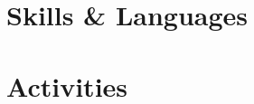 \documentclass[10pt]{article}
\begin{document}
\cockpit
\befungepy
\termdo
\matsciseg
\ratiocontour
\digitalcollation

\begin{minipage}{\linewidth}
  \section{Skills \& Languages}
  \begin{multicols}{4}
    \raggedcolumns
    \begin{itemize}
      \renewcommand{\labelitemi}{}
      \renewcommand{\skill}{\textnormal}
      \setlength{\itemsep}{1pt}
      \setlength{\parskip}{0pt}
      \setlength{\parsep}{0pt}
      \skillsListLong
    \end{itemize}
  \end{multicols}
  \skillsLegend
\end{minipage}
\vspace{-1em}

\section{Activities}
\activities

\footerCV
\end{document}
